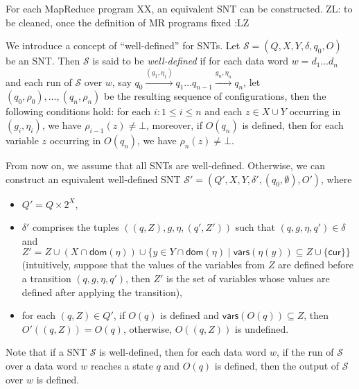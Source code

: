 \documentclass[runningheads,a4paper]{llncs}
\def\Ss{{\mathcal{S} }}
\newcommand\cur{\mathsf{cur}}
\newcommand\vars{\mathsf{vars}}
\newcommand\dom{\mathsf{dom}}
\newcommand{\zhilin}[1]{\color{cyan} {ZL: #1 :LZ} \color{black}}
\begin{document}
\begin{proposition}\label{prop-mrprog-to-snt}
For each MapReduce program XX, an equivalent SNT can be constructed. \zhilin{to be cleaned, once the definition of MR programs fixed}
\end{proposition}



We introduce a concept of ``well-defined'' for SNTs. Let $\Ss=(Q,X,Y,\delta,q_0,O)$ be an SNT. Then $\Ss$ is said to be \emph{well-defined} if for each data word $w=d_1\dots d_n$ and each run of $\Ss$ over $w$, say  $q_0 \xrightarrow{(g_1,\eta_1)} q_1 \dots q_{n-1} \xrightarrow{g_n,\eta_n} q_n$, let $(q_0,\rho_0),\dots,(q_n,\rho_n)$ be the resulting sequence of configurations, then the following conditions hold: for each $i: 1 \le i \le n$ and each $z \in X \cup Y$ occurring in $(g_i,\eta_i)$, we have $\rho_{i-1}(z) \neq \bot$, moreover, if $O(q_n)$ is defined, then for each variable $z$ occurring in $O(q_n)$, we have $\rho_{n}(z) \neq \bot$.

From now on, we assume that all SNTs are well-defined. Otherwise, we can construct an equivalent well-defined SNT $\Ss'=(Q', X,Y, \delta', (q_0,\emptyset), O')$, where 
\begin{itemize}
\item $Q' = Q \times 2^X$,
%
\item $\delta'$ comprises the tuples $((q,Z),g,\eta,(q', Z'))$ such that $(q,g,\eta,q') \in \delta$ and $Z' = Z \cup (X \cap \dom(\eta)) \cup \{y \in Y \cap \dom(\eta) \mid \vars(\eta(y)) \subseteq Z \cup \{\cur\}\}$ (intuitively, suppose that the values of the variables from $Z$ are defined before a transition $(q,g,\eta,q')$, then $Z'$ is the set of variables whose values are defined after applying the transition),
%
\item for each $(q,Z) \in Q'$, if $O(q)$ is defined and $\vars(O(q)) \subseteq Z$, then $O'((q,Z))=O(q)$, otherwise, $O((q,Z))$ is undefined.
\end{itemize} 

Note that if a SNT $\Ss$ is well-defined, then for each data word $w$, if the run of $\Ss$ over a data word $w$ reaches a state $q$ and $O(q)$ is defined, then the output of $\Ss$ over $w$ is defined.
\end{document}
